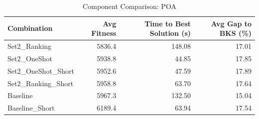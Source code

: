 \documentclass{article}
\begin{document}
\begin{table}[htbp]
\centering
\caption{Component Comparison: POA}
\label{tab:comparison_poa}
\begin{tabular}{lrrr}
\toprule
Combination & Avg Fitness & Time to Best Solution (s) & Avg Gap to BKS (\%) \\
\midrule
Set2\_Ranking & 5836.4 & 148.08 & 17.01 \\
Set2\_OneShot & 5938.8 & 44.85 & 17.85 \\
Set2\_OneShot\_Short & 5952.6 & 47.59 & 17.89 \\
Set2\_Ranking\_Short & 5958.8 & 63.70 & 17.64 \\
Baseline & 5967.3 & 132.50 & 15.04 \\
Baseline\_Short & 6189.4 & 63.94 & 17.54 \\
\bottomrule
\end{tabular}
\end{table}
\end{document}
